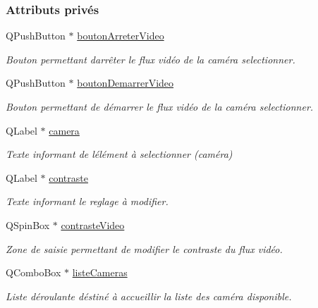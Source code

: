 \subsubsection*{Attributs privés}
\begin{DoxyCompactItemize}
\item 
Q\+Push\+Button $\ast$ \hyperlink{class_i_h_m_reglage_video_a705db68dd445a91a4144a3c9bf95a9cf}{bouton\+Arreter\+Video}
\begin{DoxyCompactList}\small\item\em Bouton permettant d\textquotesingle{}arrêter le flux vidéo de la caméra selectionner. \end{DoxyCompactList}\item 
Q\+Push\+Button $\ast$ \hyperlink{class_i_h_m_reglage_video_a98d33390551ab92165f192be44f6361d}{bouton\+Demarrer\+Video}
\begin{DoxyCompactList}\small\item\em Bouton permettant de démarrer le flux vidéo de la caméra selectionner. \end{DoxyCompactList}\item 
Q\+Label $\ast$ \hyperlink{class_i_h_m_reglage_video_a5a57047117d423ba8bf62bbcb2baee74}{camera}
\begin{DoxyCompactList}\small\item\em Texte informant de l\textquotesingle{}élément à selectionner (caméra) \end{DoxyCompactList}\item 
Q\+Label $\ast$ \hyperlink{class_i_h_m_reglage_video_ad1aa173a98ced9f3aaeccb0c2712093c}{contraste}
\begin{DoxyCompactList}\small\item\em Texte informant le reglage à modifier. \end{DoxyCompactList}\item 
Q\+Spin\+Box $\ast$ \hyperlink{class_i_h_m_reglage_video_a617e9dbd5a92c35e7e351228354deb63}{contraste\+Video}
\begin{DoxyCompactList}\small\item\em Zone de saisie permettant de modifier le contraste du flux vidéo. \end{DoxyCompactList}\item 
Q\+Combo\+Box $\ast$ \hyperlink{class_i_h_m_reglage_video_a38a35548ddd0e5750917305ac6f32142}{liste\+Cameras}
\begin{DoxyCompactList}\small\item\em Liste déroulante déstiné à accueillir la liste des caméra disponible. \end{DoxyCompactList}\item 

\end{DoxyCompactItemize}
